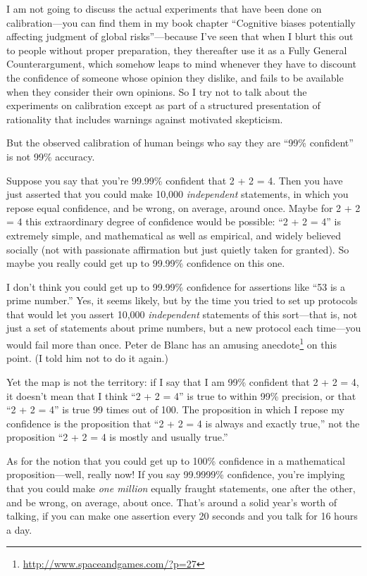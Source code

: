 {
 I am not going to discuss the actual experiments that have been
done on calibration---you can find them in my book chapter
``Cognitive biases potentially affecting judgment of
global risks''---because I've seen
that when I blurt this out to people without proper preparation, they
thereafter use it as a Fully General Counterargument, which somehow
leaps to mind whenever they have to discount the confidence of someone
whose opinion they dislike, and fails to be available when they
consider their own opinions. So I try not to talk about the experiments
on calibration except as part of a structured presentation of
rationality that includes warnings against motivated skepticism.}

{
 But the observed calibration of human beings who say they are
``99\% confident'' is not 99\%
accuracy.}

{
 Suppose you say that you're 99.99\% confident that
2 + 2 = 4. Then you have just asserted that you could make 10,000
\textit{independent} statements, in which you repose equal confidence,
and be wrong, on average, around once. Maybe for 2 + 2 = 4 this
extraordinary degree of confidence would be possible:
``2 + 2 = 4'' is extremely simple,
and mathematical as well as empirical, and widely believed socially
(not with passionate affirmation but just quietly taken for granted).
So maybe you really could get up to 99.99\% confidence on this one.}

{
 I don't think you could get up to 99.99\%
confidence for assertions like ``53 is a prime
number.'' Yes, it seems likely, but by the time you
tried to set up protocols that would let you assert 10,000
\textit{independent} statements of this sort---that is, not just a set
of statements about prime numbers, but a new protocol each time---you
would fail more than once. Peter de Blanc has an amusing anecdote\footnote{\url{http://www.spaceandgames.com/?p=27}} on
this point. (I told him not to do it again.)}

{
 Yet the map is not the territory: if I say that I am 99\%
confident that 2 + 2 = 4, it doesn't mean that I think
``2 + 2 = 4'' is true to within 99\%
precision, or that ``2 + 2 = 4'' is
true 99 times out of 100. The proposition in which I repose my
confidence is the proposition that ``2 + 2 = 4 is
always and exactly true,'' not the proposition
``2 + 2 = 4 is mostly and usually
true.''}

{
 As for the notion that you could get up to 100\% confidence in a
mathematical proposition---well, really now! If you say 99.9999\%
confidence, you're implying that you could make
\textit{one million} equally fraught statements, one after the other,
and be wrong, on average, about once. That's around a
solid year's worth of talking, if you can make one
assertion every 20 seconds and you talk for 16 hours a day.}

